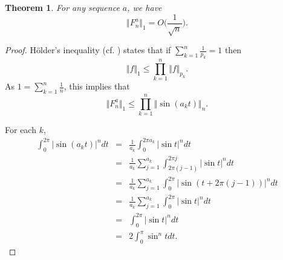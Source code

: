 \documentclass{article}
\newcommand{\norm}[1]{\Vert #1 \Vert}
\newtheorem{theorem}{Theorem}
\begin{document}
\begin{theorem} 
For any sequence $a$, we have
\[
\norm{F_n^a}_1 = O\Big(\frac{1}{\sqrt{n}}\Big).
\]
\label{hoelder}
\end{theorem}
\begin{proof}
H\"older's inequality \cite[p.~45, Theorem 2.3]{lieb} (cf. \cite[p.~151, Exercise 9.9]{master}) states
that if $\sum_{k=1}^n \frac{1}{p_k}=1$ then
\[
\norm{f}_1 \leq \prod_{k=1}^n \norm{f}_{p_k}.
\]
As $1=\sum_{k=1}^n \frac{1}{n}$, this implies that
\[
\norm{F_n^a}_1 \leq \prod_{k=1}^n \norm{\sin (a_k t)}_n.
\]

For each $k$,
\begin{eqnarray*}
\int_0^{2\pi} |\sin (a_k t)|^n dt&=&\frac{1}{a_k} \int_0^{2\pi a_k} |\sin t|^n dt\\
&=&\frac{1}{a_k} \sum_{j=1}^{a_k} \int_{2\pi(j-1)}^{2\pi j} |\sin t|^n dt\\
&=&\frac{1}{a_k}\sum_{j=1}^{a_k} \int_0^{2\pi} |\sin(t+2\pi (j-1))|^n dt\\
&=&\frac{1}{a_k}\sum_{j=1}^{a_k} \int_0^{2\pi} |\sin t|^n dt\\
&=&\int_0^{2\pi} |\sin t|^n dt\\
&=&2\int_0^\pi \sin^n t dt.
\end{eqnarray*}


\end{proof}
\end{document}
